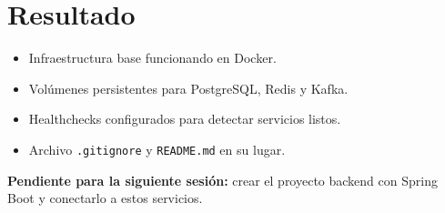 \section{Resultado}

\begin{exito}
\begin{itemize}[leftmargin=*]
  \item Infraestructura base funcionando en Docker.
  \item Volúmenes persistentes para PostgreSQL, Redis y Kafka.
  \item Healthchecks configurados para detectar servicios listos.
  \item Archivo \texttt{.gitignore} y \texttt{README.md} en su lugar.
\end{itemize}
\end{exito}

\textbf{Pendiente para la siguiente sesión:} crear el proyecto backend con Spring Boot y conectarlo a estos servicios.